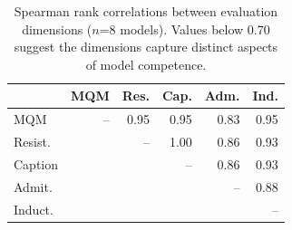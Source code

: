 \begin{table}[H]
\centering
\footnotesize
\setlength{\tabcolsep}{2pt}
\begin{tabular}{@{}lrrrrr@{}}
\toprule
& \textbf{MQM} & \textbf{Res.} & \textbf{Cap.} & \textbf{Adm.} & \textbf{Ind.} \\
\midrule
MQM & -- & 0.95 & 0.95 & 0.83 & 0.95 \\
Resist. &  & -- & 1.00 & 0.86 & 0.93 \\
Caption &  &  & -- & 0.86 & 0.93 \\
Admit. &  &  &  & -- & 0.88 \\
Induct. &  &  &  &  & -- \\
\bottomrule
\end{tabular}
\caption{Spearman rank correlations between evaluation dimensions ($n$=8 models). Values below 0.70 suggest the dimensions capture distinct aspects of model competence.}
\label{tab:cross-dim}
\end{table}
